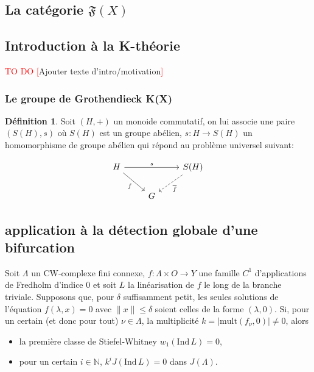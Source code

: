 \documentclass[a4paper,12pt,oneside,titlepage]{article}
\renewcommand{\bar}[1]{\overline{#1}}
\newcommand{\todo}[1]{\textcolor{red}{TO DO [}#1\textcolor{red}{]}}
\theoremstyle{definition}
\newtheorem{definition}{Définition}[section]
\theoremstyle{plain}
\begin{document}
\subsection{La catégorie $\mathfrak{F}(X)$}
\subsection{Introduction à la K-théorie}
\todo{Ajouter texte d'intro/motivation}
\subsubsection{Le groupe de Grothendieck K(X)}
\begin{definition}
    Soit $(H,+)$ un monoide commutatif, on lui associe une paire $(S(H),s)$ où $S(H)$ est un groupe abélien, $s:H\rightarrow S(H)$ un homomorphisme de groupe abélien qui répond au problème universel suivant: 
    \begin{center}
        \[\begin{tikzcd}
        H && {S(H)} \\
        & G
        \arrow["s", from=1-1, to=1-3]
        \arrow["f"', from=1-1, to=2-2]
        \arrow["{\bar{f}}", dashed, from=1-3, to=2-2]
        \end{tikzcd}\]
    \end{center}
\end{definition}

\subsection{application à la détection globale d'une bifurcation}

\begin{theobox}{}{}
Soit $\Lambda$ un CW-complexe fini connexe, $f : \Lambda \times O \to Y$ une famille $C^1$ d'applications de Fredholm d'indice $0$ et soit $L$ la linéarisation de $f$ le long de la branche triviale. Supposons que, pour $\delta$ suffisamment petit, les seules solutions de l'équation $f(\lambda, x) = 0$ avec $\|x\| \leq \delta$ soient celles de la forme $(\lambda, 0)$. Si, pour un certain (et donc pour tout) $\nu \in \Lambda$, la multiplicité $k = |\mathrm{mult}(f_\nu, 0)| \neq 0$, alors
\begin{itemize}
    \item[(a)] la première classe de Stiefel-Whitney $w_1(\mathrm{Ind}\, L) = 0$,
    \item[(b)] pour un certain $i \in \mathbb{N}$, $k^i J(\mathrm{Ind}\, L) = 0$ dans $J(\Lambda)$.
\end{itemize}
\end{theobox}
\end{document}
